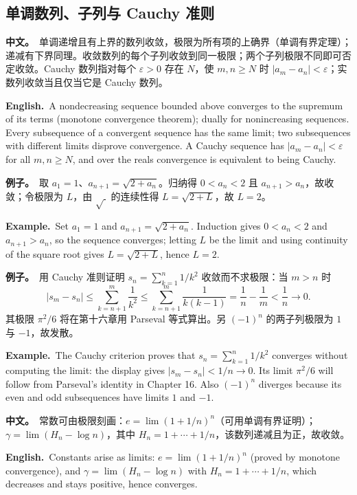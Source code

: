 \documentclass[UTF8,11pt,a4paper]{ctexart}
\newcommand{\BOTH}[2]{\par\noindent\textbf{中文。}\ #1\par\noindent\textbf{English.}\ #2\par}
\newcommand{\EX}[2]{\par\noindent\textbf{例子。}\ #1\par\noindent\textbf{Example.}\ #2\par}
\begin{document}
\subsection{单调数列、子列与 Cauchy 准则}
\BOTH{单调递增且有上界的数列收敛，极限为所有项的上确界（单调有界定理）；递减有下界同理。收敛数列的每个子列收敛到同一极限；两个子列极限不同即可否定收敛。Cauchy 数列指对每个 $\varepsilon>0$ 存在 $N$，使 $m,n\ge N$ 时 $|a_m-a_n|<\varepsilon$；实数列收敛当且仅当它是 Cauchy 数列。}{A nondecreasing sequence bounded above converges to the supremum of its terms (monotone convergence theorem); dually for nonincreasing sequences. Every subsequence of a convergent sequence has the same limit; two subsequences with different limits disprove convergence. A Cauchy sequence has $|a_m-a_n|<\varepsilon$ for all $m,n\ge N$, and over the reals convergence is equivalent to being Cauchy.}
\EX{取 $a_1=1$、$a_{n+1}=\sqrt{2+a_n}$。归纳得 $0<a_n<2$ 且 $a_{n+1}>a_n$，故收敛；令极限为 $L$，由 $\sqrt{\ }$ 的连续性得 $L=\sqrt{2+L}$，故 $L=2$。}{Set $a_1=1$ and $a_{n+1}=\sqrt{2+a_n}$. Induction gives $0<a_n<2$ and $a_{n+1}>a_n$, so the sequence converges; letting $L$ be the limit and using continuity of the square root gives $L=\sqrt{2+L}$, hence $L=2$.}
\EX{用 Cauchy 准则证明 $s_n=\sum_{k=1}^n1/k^2$ 收敛而不求极限：当 $m>n$ 时
\[
|s_m-s_n|\le\sum_{k=n+1}^{m}\frac1{k^2}\le\sum_{k=n+1}^{m}\frac1{k(k-1)}=\frac1n-\frac1m<\frac1n\to0 .
\]
其极限 $\pi^2/6$ 将在第十六章用 Parseval 等式算出。另 $(-1)^n$ 的两子列极限为 $1$ 与 $-1$，故发散。}{The Cauchy criterion proves that $s_n=\sum_{k=1}^n1/k^2$ converges without computing the limit: the display gives $|s_m-s_n|<1/n\to0$. Its limit $\pi^2/6$ will follow from Parseval's identity in Chapter 16. Also $(-1)^n$ diverges because its even and odd subsequences have limits $1$ and $-1$.}
\BOTH{常数可由极限刻画：$e=\lim(1+1/n)^n$（可用单调有界证明）；$\gamma=\lim(H_n-\log n)$，其中 $H_n=1+\cdots+1/n$，该数列递减且为正，故收敛。}{Constants arise as limits: $e=\lim(1+1/n)^n$ (proved by monotone convergence), and $\gamma=\lim(H_n-\log n)$ with $H_n=1+\cdots+1/n$, which decreases and stays positive, hence converges.}
\end{document}
